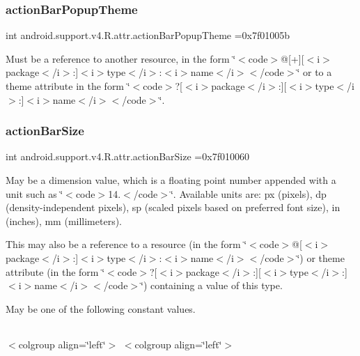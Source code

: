 \subsubsection{\texorpdfstring{action\+Bar\+Popup\+Theme}{actionBarPopupTheme}}
{\footnotesize\ttfamily int android.\+support.\+v4.\+R.\+attr.\+action\+Bar\+Popup\+Theme =0x7f01005b\hspace{0.3cm}{\ttfamily [static]}}

Must be a reference to another resource, in the form \char`\"{}$<$code$>$@\mbox{[}+\mbox{]}\mbox{[}$<$i$>$package$<$/i$>$\+:\mbox{]}$<$i$>$type$<$/i$>$\+:$<$i$>$name$<$/i$>$$<$/code$>$\char`\"{} or to a theme attribute in the form \char`\"{}$<$code$>$?\mbox{[}$<$i$>$package$<$/i$>$\+:\mbox{]}\mbox{[}$<$i$>$type$<$/i$>$\+:\mbox{]}$<$i$>$name$<$/i$>$$<$/code$>$\char`\"{}. \mbox{\label{classandroid_1_1support_1_1v4_1_1R_1_1attr_a1d83594440797e711b748e5b66c2852d}} 
\subsubsection{\texorpdfstring{action\+Bar\+Size}{actionBarSize}}
{\footnotesize\ttfamily int android.\+support.\+v4.\+R.\+attr.\+action\+Bar\+Size =0x7f010060\hspace{0.3cm}{\ttfamily [static]}}

May be a dimension value, which is a floating point number appended with a unit such as \char`\"{}$<$code$>$14.\+5sp$<$/code$>$\char`\"{}. Available units are\+: px (pixels), dp (density-\/independent pixels), sp (scaled pixels based on preferred font size), in (inches), mm (millimeters). 

This may also be a reference to a resource (in the form \char`\"{}$<$code$>$@\mbox{[}$<$i$>$package$<$/i$>$\+:\mbox{]}$<$i$>$type$<$/i$>$\+:$<$i$>$name$<$/i$>$$<$/code$>$\char`\"{}) or theme attribute (in the form \char`\"{}$<$code$>$?\mbox{[}$<$i$>$package$<$/i$>$\+:\mbox{]}\mbox{[}$<$i$>$type$<$/i$>$\+:\mbox{]}$<$i$>$name$<$/i$>$$<$/code$>$\char`\"{}) containing a value of this type. 

May be one of the following constant values.

\tabulinesep=1mm
\begin{longtabu} spread 0pt [c]{*{0}{|X[-1]}|}
\hline
\end{longtabu}
$<$colgroup align=\char`\"{}left\char`\"{}$>$ $<$colgroup align=\char`\"{}left\char`\"{}$>$ 

